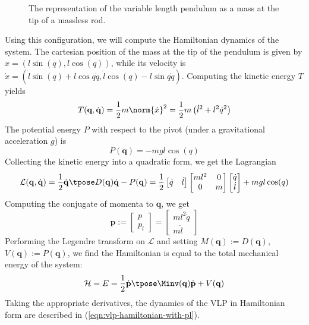 \begin{figure}
   \centering
   
   \caption{The representation of the variable length pendulum as a mass at the
      tip of a massless rod.}\label{fig:vlp_model}
\end{figure}

Using this configuration, we will compute the Hamiltonian dynamics of the system.
The cartesian position of the mass at the tip of the pendulum
is given by \(x = (l\sin(q),l\cos(q))\), while its velocity is
\(\dot{x} = (\dot{l}\sin(q) + l\cos{q}\dot{q}, \dot{l}\cos(q) - l\sin{q}\dot{q})\).
Computing the kinetic energy \(T\) yields
\[
   T(\mathbf{q},\dot{\mathbf{q}}) = 
   \frac{1}{2}m\norm{\dot{x}}^2 = \frac{1}{2}m\left(\dot{l}^2 + l^2\dot{q}^2\right)
\]
The potential energy \(P\) with respect to the pivot (under a gravitational
acceleration \(g\)) is
\[
   P(\mathbf{q}) = -mgl\cos(q)
\]
Collecting the kinetic energy into a quadratic form, we get the Lagrangian
\[
   \mathcal{L}(\mathbf{q},\dot{\mathbf{q}}) 
   = \frac{1}{2} \dot{\mathbf{q}}\tpose D(\mathbf{q})\dot{\mathbf{q}} - P(\mathbf{q})
   = \frac{1}{2}
   \begin{bmatrix} \dot{q} & \dot{l} \end{bmatrix}
   \begin{bmatrix}
      ml^2 & 0 \\
      0 & m \\
   \end{bmatrix}
   \begin{bmatrix} 
      \dot{q} \\ \dot{l}
   \end{bmatrix}
   + mgl\cos(q)
\]
Computing the conjugate of momenta to \(\mathbf{q}\), we get 
\[
   \mathbf{p} := \begin{bmatrix} p \\ p_l \end{bmatrix} 
   = \begin{bmatrix} ml^2\dot{q} \\ m\dot{l} \end{bmatrix} 
\]
Performing the Legendre transform on \(\mathcal{L}\) and setting
\(M(\mathbf{q}) := D(\mathbf{q})\), \(V(\mathbf{q}) := P(\mathbf{q})\),
we find the Hamiltonian is equal to the total mechanical energy of the system:
\[
   \mathcal{H} = E = \frac{1}{2}\dot{\mathbf{p}}\tpose \Minv(\mathbf{q})
   \dot{\mathbf{p}}+V(\mathbf{q})
\]
Taking the appropriate derivatives, the dynamics of the VLP in Hamiltonian form
are described in (\ref{eqn:vlp-hamiltonian-with-pl}). 

